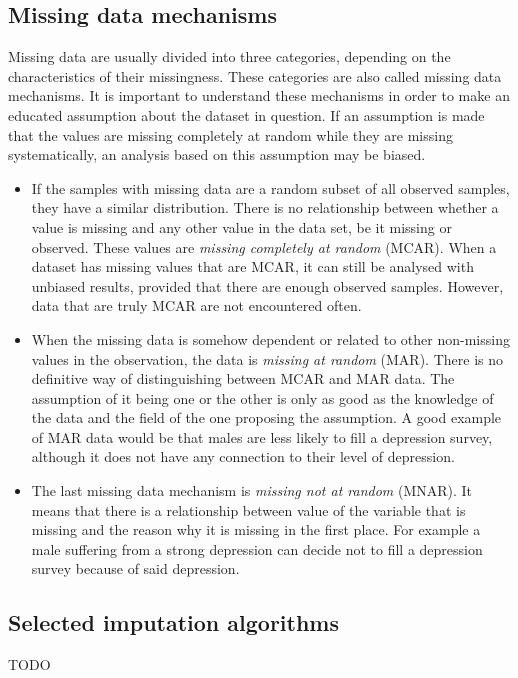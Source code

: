 \documentclass[11pt]{article}
\begin{document}
    \subsection{Missing data mechanisms}
      Missing data are usually divided into three categories, depending on the characteristics of their missingness. These categories are also called missing data mechanisms.\cite{lwd} It is important to understand these mechanisms in order to make an educated assumption about the dataset in question. If an assumption is made that the values are missing completely at random while they are missing systematically, an analysis based on this assumption may be biased.
      \begin{itemize}
      \item If the samples with missing data are a random subset of all observed samples, they have a similar distribution. There is no relationship between whether a value is missing and any other value in the data set, be it missing or observed. These values are {\it missing completely at random} (MCAR).\cite{lwd} When a dataset has missing values that are MCAR, it can still be analysed with unbiased results, provided that there are enough observed samples. However, data that are truly MCAR are not encountered often.
      \item When the missing data is somehow dependent or related to other non-missing values in the observation, the data is {\it missing at random} (MAR).\cite{lwd} There is no definitive way of distinguishing between MCAR and MAR data. The assumption of it being one or the other is only as good as the knowledge of the data and the field of the one proposing the assumption. A good example of MAR data would be that males are less likely to fill a depression survey, although it does not have any connection to their level of depression.
      \item The last missing data mechanism is {\it missing not at random} (MNAR). It means that there is a relationship between value of the variable that is missing and the reason why it is missing in the first place. For example a male suffering from a strong depression can decide not to fill a depression survey because of said depression.
      \end{itemize}
    \subsection{Selected imputation algorithms}
      {\color{red}TODO}
\end{document}
